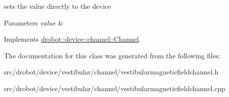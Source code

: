 sets the value directly to the device 


\begin{DoxyParams}{Parameters}
{\em value} & \\
\hline
\end{DoxyParams}


Implements \hyperlink{classdrobot_1_1device_1_1channel_1_1Channel_a612a3f6afe59e238583d6d40d9ddcaf8}{drobot\-::device\-::channel\-::\-Channel}.



The documentation for this class was generated from the following files\-:\begin{DoxyCompactItemize}
\item 
src/drobot/device/vestibular/channel/vestibularmagneticfieldchannel.\-h\item 
src/drobot/device/vestibular/channel/vestibularmagneticfieldchannel.\-cpp\end{DoxyCompactItemize}
